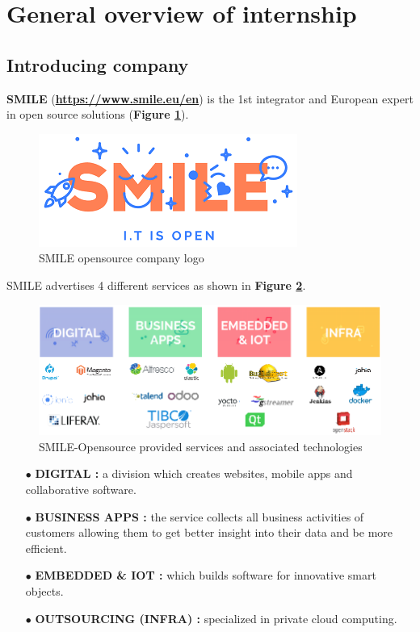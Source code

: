 \section{General overview of internship}

\subsection{Introducing company}
\textbf{SMILE} (\textbf{\color{blue}\url{https://www.smile.eu/en}}) is the 1st integrator and European expert in open source solutions (\textbf{Figure \ref{SMILE opensource company}}). 

			\begin{figure}[H]
					\centering
        			\includegraphics[scale=0.55]{img/smile.png}
        			\caption{SMILE opensource company logo}
        			\label{SMILE opensource company}
   			 \end{figure}

SMILE advertises 4 different services as shown in \textbf{Figure \ref{SMILE opensource services and associated opensource technologies}}.
			\begin{figure}[H]
					\centering
        			\includegraphics[scale=0.55]{img/smile-services-technologies.png}
        			\caption{SMILE-Opensource provided services and associated technologies}
        			\label{SMILE opensource services and associated opensource technologies}
   			 \end{figure}


\begin{itemize}
	\item[$\bullet$] \textbf{DIGITAL : } a division which creates websites, mobile apps and collaborative software. 
	\item[$\bullet$] \textbf{BUSINESS APPS : } the service collects all business activities of customers allowing them to get better insight into their data and be more efficient. 
	\item[$\bullet$] \textbf{EMBEDDED \& IOT : } which builds software for innovative smart objects.
	\item[$\bullet$] \textbf{OUTSOURCING (INFRA) : } specialized in private cloud computing. 
\end{itemize}


